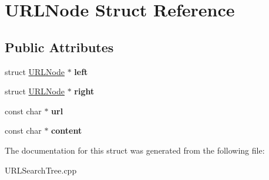 \hypertarget{structURLNode}{\section{\-U\-R\-L\-Node \-Struct \-Reference}
\label{structURLNode}
}
\subsection*{\-Public \-Attributes}
\begin{DoxyCompactItemize}
\item 
\hypertarget{structURLNode_a8668b5a701d39dde07f171c987233343}{struct \hyperlink{structURLNode}{\-U\-R\-L\-Node} $\ast$ {\bfseries left}}\label{structURLNode_a8668b5a701d39dde07f171c987233343}

\item 
\hypertarget{structURLNode_ac7246d0b922dad7c70dc74088de96c5b}{struct \hyperlink{structURLNode}{\-U\-R\-L\-Node} $\ast$ {\bfseries right}}\label{structURLNode_ac7246d0b922dad7c70dc74088de96c5b}

\item 
\hypertarget{structURLNode_ad682feead55da0df4f4630a41bcaa025}{const char $\ast$ {\bfseries url}}\label{structURLNode_ad682feead55da0df4f4630a41bcaa025}

\item 
\hypertarget{structURLNode_aab5544f645e09fd251094437376d4397}{const char $\ast$ {\bfseries content}}\label{structURLNode_aab5544f645e09fd251094437376d4397}

\end{DoxyCompactItemize}


\-The documentation for this struct was generated from the following file\-:\begin{DoxyCompactItemize}
\item 
\-U\-R\-L\-Search\-Tree.\-cpp\end{DoxyCompactItemize}
